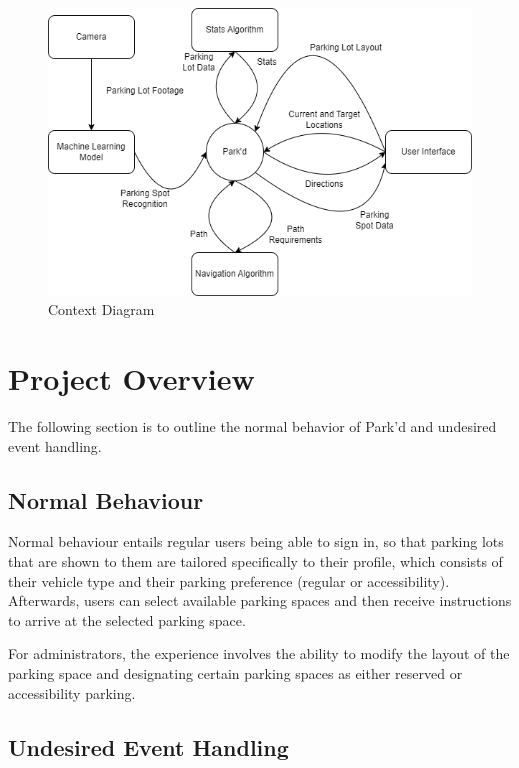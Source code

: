 \documentclass[12pt, titlepage]{article}
\begin{document}
\begin{figure}[ht]
    \begin{center}
        \includegraphics[scale=0.5]{ContextDiagram.png}
        \caption{Context Diagram}
    \end{center}
\end{figure}

\newpage

\section{Project Overview}

The following section is to outline the normal behavior of Park'd and undesired
event handling.

\subsection{Normal Behaviour}

Normal behaviour entails regular users being able to sign in, so that parking
lots that are shown to them are tailored specifically to their profile, which
consists of their vehicle type and their parking preference (regular or
accessibility). Afterwards, users can select available parking spaces and then
receive instructions to arrive at the selected parking space. 

For administrators, the experience involves the ability to modify the layout of
the parking space and designating certain parking spaces as either reserved or
accessibility parking.

\subsection{Undesired Event Handling}
\end{document}
